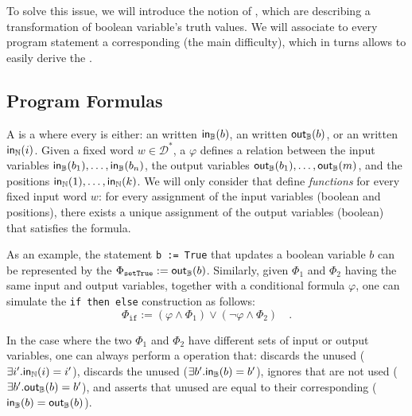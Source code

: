 To solve this issue, we will introduce the notion of ,
which are  describing a transformation of boolean
variable's truth values. We will associate to every program statement a
corresponding  (the main difficulty), which in turns allows
to easily derive the .

\subsection{Program Formulas}
\label{sec:program-formulas}

\AP A  is a  where every
 is either: an   written
$\mathsf{in}_{\mathbb{B}}(b)$,  an  written $\mathsf{out}_{\mathbb{B}}(b)$, or an
 written $\mathsf{in}_{\mathbb{N}}(i)$. Given a fixed word $w \in
\mathcal{D}^*$, a  $\varphi$ defines a relation between the
input variables $\mathsf{in}_{\mathbb{B}}(b_1), \dots, \mathsf{in}_{\mathbb{B}}(b_n)$, the output variables
$\mathsf{out}_{\mathbb{B}}(b_1), \dots, \mathsf{out}_{\mathbb{B}}(m)$, and the positions $\mathsf{in}_{\mathbb{N}}(1), \dots,
\mathsf{in}_{\mathbb{N}}(k)$. We will only consider  that define
\emph{functions} for every fixed input word $w$: for every assignment of the
input variables (boolean and positions), there exists a unique assignment of the
output variables (boolean) that satisfies the formula.

As an example, the statement \texttt{b := True} that updates a boolean variable
$b$ can be represented by the  $\Phi_{\texttt{setTrue}} :=
\mathsf{out}_{\mathbb{B}}(b)$. Similarly, given  $\Phi_1$ and $\Phi_2$ having 
the same input and output variables,
together with a conditional formula $\varphi$, one can 
simulate the \texttt{if then else} construction 
as follows:
\begin{equation*}
    \Phi_{\texttt{if}} := (\varphi \land \Phi_1) \lor (\neg \varphi \land \Phi_2) \quad .
\end{equation*}

\AP In the case where the two  $\Phi_1$ and $\Phi_2$ have
different sets of input or output variables, one can always perform a
 operation that: discards the unused  ($\exists i'. \mathsf{in}_{\mathbb{N}}(i) = i'$), discards the unused  ($\exists b'. \mathsf{in}_{\mathbb{B}}(b) = b'$), ignores  that are not used ($\exists b'. \mathsf{out}_{\mathbb{B}}(b) = b'$), and asserts that
unused  are equal to their corresponding  ($\mathsf{in}_{\mathbb{B}}(b) = \mathsf{out}_{\mathbb{B}}(b)$).


